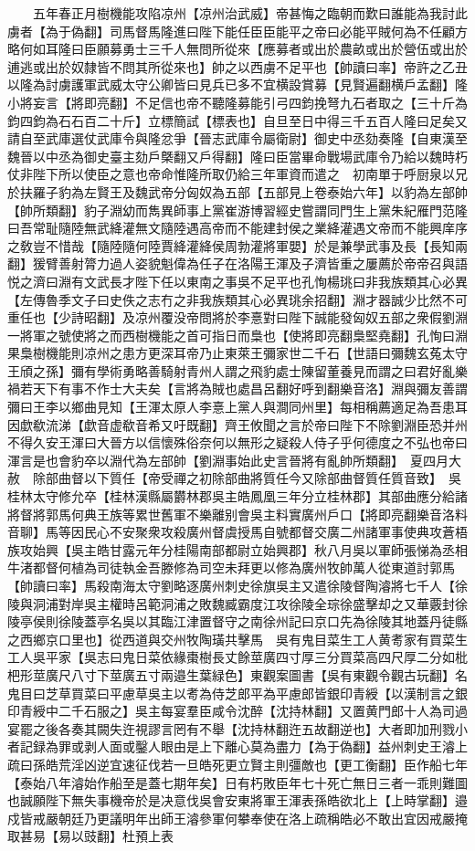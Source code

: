 　　五年春正月樹機能攻陷凉州【凉州治武威】帝甚悔之臨朝而歎曰誰能為我討此虜者【為于偽翻】司馬督馬隆進曰陛下能任臣臣能平之帝曰必能平賊何為不任顧方略何如耳隆曰臣願募勇士三千人無問所從來【應募者或出於農畝或出於營伍或出於逋逃或出於奴隸皆不問其所從來也】帥之以西虜不足平也【帥讀曰率】帝許之乙丑以隆為討虜護軍武威太守公卿皆曰見兵已多不宜横設賞募【見賢遍翻横戶孟翻】隆小將妄言【將即亮翻】不足信也帝不聽隆募能引弓四鈞挽弩九石者取之【三十斤為鈞四鈞為石石百二十斤】立標簡試【標表也】自旦至日中得三千五百人隆曰足矣又請自至武庫選仗武庫令與隆忿爭【晉志武庫令屬衛尉】御史中丞劾奏隆【自東漢至魏晉以中丞為御史臺主劾戶槩翻又戶得翻】隆曰臣當畢命戰場武庫令乃給以魏時朽仗非陛下所以使臣之意也帝命惟隆所取仍給三年軍資而遣之　初南單于呼厨泉以兄於扶羅子豹為左賢王及魏武帝分匈奴為五部【五部見上卷泰始六年】以豹為左部帥【帥所類翻】豹子淵幼而雋異師事上黨崔游博習經史嘗謂同門生上黨朱紀雁門范隆曰吾常耻隨陸無武絳灌無文隨陸遇高帝而不能建封侯之業絳灌遇文帝而不能興庠序之敎豈不惜哉【隨陸隨何陸賈絳灌絳侯周勃灌將軍嬰】於是兼學武事及長【長知兩翻】猨臂善射膂力過人姿貌魁偉為任子在洛陽王渾及子濟皆重之屢薦於帝帝召與語悦之濟曰淵有文武長才陛下任以東南之事吳不足平也孔恂楊珧曰非我族類其心必異【左傳魯季文子曰史佚之志冇之非我族類其心必異珧余招翻】淵才器誠少比然不可重任也【少詩昭翻】及凉州覆没帝問將於李憙對曰陛下誠能發匈奴五部之衆假劉淵一將軍之號使將之而西樹機能之首可指日而梟也【使將即亮翻梟堅堯翻】孔恂曰淵果梟樹機能則凉州之患方更深耳帝乃止東萊王彌家世二千石【世語曰彌魏玄菟太守王頎之孫】彌有學術勇略善騎射青州人謂之飛豹處士陳留董養見而謂之曰君好亂樂禍若天下有事不作士大夫矣【言將為賊也處昌呂翻好呼到翻樂音洛】淵與彌友善謂彌曰王李以鄉曲見知【王渾太原人李憙上黨人與澗同州里】每相稱薦適足為吾患耳因歔欷流涕【歔音虚欷音希又吁既翻】齊王攸聞之言於帝曰陛下不除劉淵臣恐并州不得久安王渾曰大晉方以信懷殊俗奈何以無形之疑殺人侍子乎何德度之不弘也帝曰渾言是也會豹卒以淵代為左部帥【劉淵事始此史言晉將有亂帥所類翻】　夏四月大赦　除部曲督以下質任【帝受禪之初除部曲將質任今又除部曲督質任質音致】　吳桂林太守修允卒【桂林漢縣屬欝林郡吳主皓鳳凰三年分立桂林郡】其部曲應分給諸將督將郭馬何典王族等累世舊軍不樂離别會吳主料實廣州戶口【將即亮翻樂音洛料音聊】馬等因民心不安聚衆攻殺廣州督虞授馬自號都督交廣二州諸軍事使典攻蒼梧族攻始興【吳主皓甘露元年分桂陽南部都尉立始興郡】秋八月吳以軍師張悌為丞相牛渚都督何植為司徒執金吾滕修為司空未拜更以修為廣州牧帥萬人從東道討郭馬【帥讀曰率】馬殺南海太守劉略逐廣州刺史徐旗吳主又遣徐陵督陶濬將七千人【徐陵與洞浦對岸吳主權時呂範洞浦之敗魏臧霸度江攻徐陵全琮徐盛擊却之又華覈封徐陵亭侯則徐陵蓋亭名吳以其臨江津置督守之南徐州記曰京口先為徐陵其地蓋丹徒縣之西鄉京口里也】從西道與交州牧陶璜共擊馬　吳有鬼目菜生工人黄耉家有買菜生工人吳平家【吳志曰鬼日菜依緣棗樹長丈餘莖廣四寸厚三分買菜高四尺厚二分如枇杷形莖廣尺八寸下莖廣五寸兩邉生葉緑色】東觀案圖書【吳有東觀令觀古玩翻】名鬼目曰芝草買菜曰平慮草吳主以耉為侍芝郎平為平慮郎皆銀印青綬【以漢制言之銀印青綬中二千石服之】吳主每宴羣臣咸令沈醉【沈持林翻】又置黄門郎十人為司過宴罷之後各奏其闕失迕視謬言罔有不舉【沈持林翻迕五故翻逆也】大者即加刑戮小者記録為罪或剥人面或鑿人眼由是上下離心莫為盡力【為于偽翻】益州刺史王濬上疏曰孫皓荒淫凶逆宜速征伐若一旦皓死更立賢主則彊敵也【更工衡翻】臣作船七年【泰始八年濬始作船至是蓋七期年矣】日有朽敗臣年七十死亡無日三者一乖則難圖也誠願陛下無失事機帝於是决意伐吳會安東將軍王渾表孫皓欲北上【上時掌翻】邉戍皆戒嚴朝廷乃更議明年出師王濬參軍何攀奉使在洛上疏稱皓必不敢出宜因戒嚴掩取甚易【易以豉翻】杜預上表
